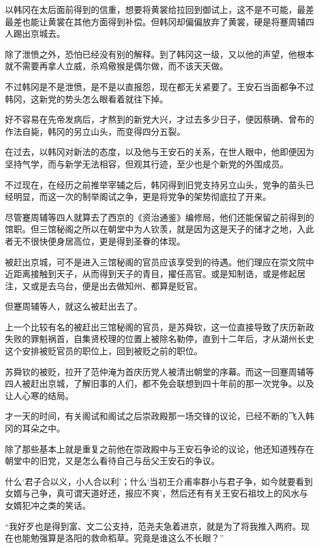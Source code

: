 以韩冈在太后面前得到的信重，想要将黄裳给拉回到御试上，这不是不可能，最差最差也能让黄裳在其他方面得到补偿。但韩冈却偏偏放弃了黄裳，硬是将蹇周辅四人踢出京城去。

除了泄愤之外，恐怕已经没有别的解释。到了韩冈这一级，又以他的声望，他根本就不需要再拿人立威，杀鸡儆猴是偶尔做，而不该天天做。

不过韩冈是不是泄愤，是不是以直报怨，现在都无关紧要了。王安石当面都争不过韩冈，这新党的势头怎么眼看着就往下掉。

好不容易在先帝发病后，才熬到的新党大兴，才过去多少日子，便因蔡确、曾布的作法自毙，韩冈的另立山头，而变得四分五裂。

在过去，以韩冈对新法的态度，以及他与王安石的关系，在世人眼中，他即便因为坚持气学，而与新学无法相容，但观其行迹，至少也是个新党的外围成员。

不过现在，在经历之前推举宰辅之后，韩冈得到旧党支持另立山头，党争的苗头已经明显，而这一次的制举阁试之争，更是将党争的架势彻底拉了开来。

尽管蹇周辅等四人就算去了西京的《资治通鉴》编修局，他们还能保留之前得到的馆职。但三馆秘阁之所以在朝堂中为人钦羡，就是因为这是天子的储才之地，入此者无不很快便身居高位，更是得到圣眷的体现。

被赶出京城，可不是进入三馆秘阁的官员应该享受到的待遇。他们理应在崇文院中近距离接触到天子，从而得到天子的青目，擢任高官。或是知制诰，或是修起居注，又或是去乌台，便是出去做知州、都算是贬官。

但蹇周辅等人，就这么被赶出去了。

上一个比较有名的被赶出三馆秘阁的官员，是苏舜钦，这一位直接导致了庆历新政失败的罪魁祸首，自集贤校理的位置上被除名勒停，直到十二年后，才从湖州长史这个安排被贬官员的职位上，回到被贬之前的职位。

苏舜钦的被贬，拉开了范仲淹为首庆历党人被清出朝堂的序幕。而这一回蹇周辅等四人被赶出京城，了解旧事的人们，都不免会联想到四十年前的那一次党争。以及让人心寒的结局。

才一天的时间，有关阁试和阁试之后崇政殿那一场交锋的议论，已经不断的飞入韩冈的耳朵之中。

除了那些基本上就是重复之前他在崇政殿中与王安石争论的议论，他还知道残存在朝堂中的旧党，又是怎么看待自己与岳父王安石的争议。

什么‘君子合以义，小人合以利’；什么‘当初王介甫率群小与君子争，如今就要看到女婿与己争，真可谓天道好还，报应不爽’，然后还有有关王安石祖坟上的风水与女婿犯冲之类的笑话。

“我好歹也是得到富、文二公支持，范尧夫急着进京，就是为了将我推入两府。现在也能勉强算是洛阳的救命稻草。究竟是谁这么不长眼？”

